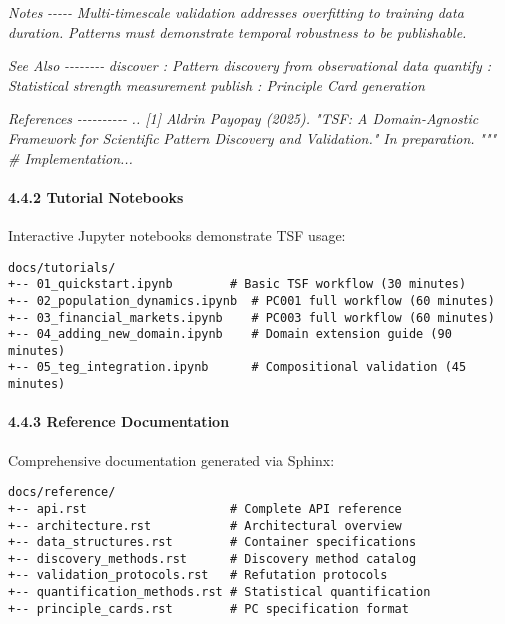 \documentclass[
]{article}
\newenvironment{Shaded}{}{}
\newcommand{\CommentTok}[1]{\textcolor[rgb]{0.38,0.63,0.69}{\textit{#1}}}
\begin{document}
\begin{Shaded}
\begin{Highlighting}[]
\CommentTok{    Notes}
\CommentTok{    {-}{-}{-}{-}{-}}
\CommentTok{    Multi{-}timescale validation addresses overfitting to training data duration.}
\CommentTok{    Patterns must demonstrate temporal robustness to be publishable.}

\CommentTok{    See Also}
\CommentTok{    {-}{-}{-}{-}{-}{-}{-}{-}}
\CommentTok{    discover : Pattern discovery from observational data}
\CommentTok{    quantify : Statistical strength measurement}
\CommentTok{    publish : Principle Card generation}

\CommentTok{    References}
\CommentTok{    {-}{-}{-}{-}{-}{-}{-}{-}{-}{-}}
\CommentTok{    .. [1] Aldrin Payopay (2025). "TSF: A Domain{-}Agnostic Framework for Scientific}
\CommentTok{           Pattern Discovery and Validation." In preparation.}
\CommentTok{    """}
    \CommentTok{\# Implementation...}
\end{Highlighting}
\end{Shaded}

\paragraph{4.4.2 Tutorial Notebooks}\label{tutorial-notebooks}

Interactive Jupyter notebooks demonstrate TSF usage:

\begin{verbatim}
docs/tutorials/
+-- 01_quickstart.ipynb        # Basic TSF workflow (30 minutes)
+-- 02_population_dynamics.ipynb  # PC001 full workflow (60 minutes)
+-- 03_financial_markets.ipynb    # PC003 full workflow (60 minutes)
+-- 04_adding_new_domain.ipynb    # Domain extension guide (90 minutes)
+-- 05_teg_integration.ipynb      # Compositional validation (45 minutes)
\end{verbatim}

\paragraph{4.4.3 Reference Documentation}\label{reference-documentation}

Comprehensive documentation generated via Sphinx:

\begin{verbatim}
docs/reference/
+-- api.rst                    # Complete API reference
+-- architecture.rst           # Architectural overview
+-- data_structures.rst        # Container specifications
+-- discovery_methods.rst      # Discovery method catalog
+-- validation_protocols.rst   # Refutation protocols
+-- quantification_methods.rst # Statistical quantification
+-- principle_cards.rst        # PC specification format
\end{verbatim}
\end{document}
